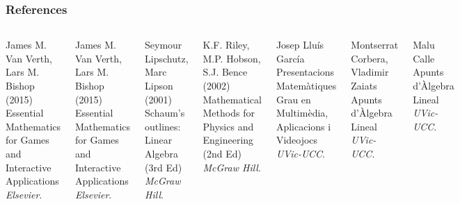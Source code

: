 \documentclass{beamer}
\begin{document}
\begin{frame}
\frametitle{References}

\footnotesize{
\begin{thebibliography}{99} %

\begin{columns}[t]

 James M. Van Verth, Lars M. Bishop (2015)
\newblock Essential Mathematics for Games and Interactive Applications
\newblock \emph{Elsevier}.

 James M. Van Verth, Lars M. Bishop (2015)
\newblock Essential Mathematics for Games and Interactive Applications
\newblock \emph{Elsevier}.

 Seymour Lipschutz, Marc Lipson (2001)
\newblock Schaum's outlines: Linear Algebra (3rd Ed)
\newblock \emph{McGraw Hill}.


 K.F. Riley, M.P. Hobson, S.J. Bence (2002)
\newblock Mathematical Methods for Physics and Engineering (2nd Ed)
\newblock \emph{McGraw Hill}.

 Josep Lluís García
\newblock Presentacions Matemàtiques Grau en Multimèdia, Aplicacions i Videojocs
\newblock \emph{UVic-UCC}.

 Montserrat Corbera, Vladimir Zaiats
\newblock Apunts d'Àlgebra Lineal
\newblock \emph{UVic-UCC}.

 Malu Calle
\newblock Apunts d'Àlgebra Lineal
\newblock \emph{UVic-UCC}.

\end{columns}
\end{thebibliography}

}
\end{frame}
\end{document}
